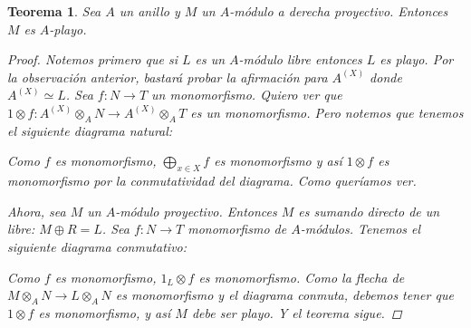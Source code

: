 \documentclass[12pt]{book}
\newtheorem{teo}{Teorema}[section]
\theoremstyle{definition}
\begin{document}
\begin{teo}
Sea $A$ un anillo y $M$ un $A$-módulo a derecha proyectivo. Entonces $M$ es $A$-playo.
\begin{proof}
Notemos primero que si $L$ es un $A$-módulo libre entonces $L$ es playo. Por la observación anterior, bastará probar la afirmación para $A^{(X)}$ donde $A^{(X)}\simeq L$. Sea $f:N\to T$ un monomorfismo. Quiero ver que $1\otimes f:A^{(X)}\otimes_A N\to A^{(X)}\otimes_A T$ es un monomorfismo. Pero notemos que tenemos el siguiente diagrama natural:
\begin{center}\end{center} Como $f$ es monomorfismo, $\displaystyle\bigoplus_{x\in X}f$ es monomorfismo y así $1\otimes f$ es monomorfismo por la conmutatividad del diagrama. Como queríamos ver.

Ahora, sea $M$ un $A$-módulo proyectivo. Entonces $M$ es sumando directo de un libre: $M\oplus R = L$. Sea $f:N\to T$ monomorfismo de $A$-módulos. Tenemos el siguiente diagrama conmutativo:
\begin{center}\end{center}

Como $f$ es monomorfismo, $1_L\otimes f$ es monomorfismo. Como la flecha de $M\otimes_A N\to L\otimes_A N$ es monomorfismo y el diagrama conmuta, debemos tener que $1\otimes f$ es monomorfismo, y así $M$ debe ser playo. Y el teorema sigue.
\end{proof}
\end{teo}
\end{document}
